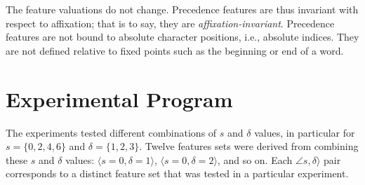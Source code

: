 The feature valuations do not change.
Precedence features are thus invariant with respect to affixation; that is to say, 
they are \emph{affixation-invariant}.
Precedence features are not bound to absolute character positions, i.e., 
absolute indices. They are not defined relative to fixed points such as 
the beginning or end of a word.

\section{Experimental Program}
The experiments tested different combinations of $s$ and $\delta$ values, 
in particular for
$s = \{0,2,4,6\}$ and $\delta = \{1,2,3\}$. Twelve features sets were derived from combining these $s$ and $\delta$ values:
$\langle s = 0, \delta =1 \rangle$,  $\langle s = 0, \delta = 2 \rangle$, and so on. %
Each $\angle s, \delta \rangle$ pair corresponds to a distinct feature set that was tested in a particular experiment. 

